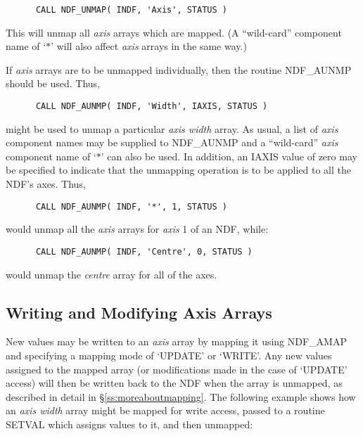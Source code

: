 \documentclass[twoside,11pt]{article}
\newcommand{\htmlref}[2]{#1}
\newcommand{\xlabel}[1]{}
\newcommand{\st}[1]{{\em{#1}}}
\begin{document}
\small
\begin{verbatim}
      CALL NDF_UNMAP( INDF, 'Axis', STATUS )
\end{verbatim}
\normalsize

This will unmap all \st{axis\/} arrays which are mapped.
(A ``wild-card'' component name of `$*$' will also affect \st{axis\/}
arrays in the same way.)

If \st{axis\/} arrays are to be unmapped individually, then the routine
\htmlref{NDF\_AUNMP}{NDF_AUNMP} should be used. 
Thus,

\small
\begin{verbatim}
      CALL NDF_AUNMP( INDF, 'Width', IAXIS, STATUS )
\end{verbatim}
\normalsize

might be used to unmap a particular \st{axis width\/} array.
As usual, a list of \st{axis\/} component names may be supplied to
NDF\_AUNMP and a ``wild-card'' \st{axis\/} component name of `$*$' can also be
used. 
In addition, an IAXIS value of zero may be specified to indicate that the
unmapping operation is to be applied to all the NDF's axes. 
Thus,

\small
\begin{verbatim}
      CALL NDF_AUNMP( INDF, '*', 1, STATUS )
\end{verbatim}
\normalsize

would unmap all the \st{axis\/} arrays for \st{axis\/} 1 of an NDF, while:

\small
\begin{verbatim}
      CALL NDF_AUNMP( INDF, 'Centre', 0, STATUS )
\end{verbatim}
\normalsize

would unmap the \st{centre\/} array for all of the axes.

\subsection{\xlabel{writing_and_modifying_axis_arrays}Writing and Modifying Axis Arrays}

New values may be written to an \st{axis\/} array by mapping it using
\htmlref{NDF\_AMAP}{NDF_AMAP} and specifying a mapping mode of `UPDATE' or `WRITE'. 
Any new values assigned to the mapped array (or modifications made in the
case of `UPDATE' access) will then be written back to the NDF when the array
is unmapped, as described in detail in \S\ref{ss:moreaboutmapping}. 
The following example shows how an \st{axis width\/} array might be mapped
for write access, passed to a routine SETVAL which assigns values to it, and
then unmapped: 
\end{document}
